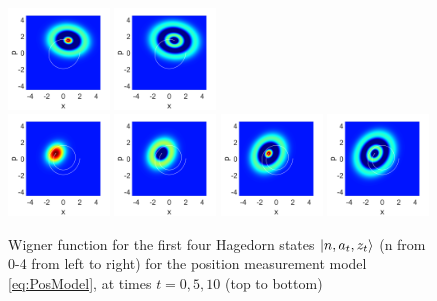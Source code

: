 \documentclass[12pt]{iopart} %
\begin{document}
\begin{figure}
\begin{centering}
	  \includegraphics[width=0.24\textwidth]{State2t5OrthoPos.pdf} 
	  \includegraphics[width=0.24\textwidth]{State3t5OrthoPos.pdf}\\
	  \includegraphics[width=0.24\textwidth]{State0t10OrthoPos.pdf}
	  \includegraphics[width=0.24\textwidth]{State1t10OrthoPos.pdf}
	  \includegraphics[width=0.24\textwidth]{State2t10OrthoPos.pdf}
	  \includegraphics[width=0.24\textwidth]{State3t10OrthoPos.pdf} \\
\caption{Wigner function for the first four Hagedorn states $\ket{n,a_t,z_t}$ (n from 0-4 from left to right) for the position measurement model \cref{eq:PosModel}, at times $t=0,5,10$ (top to bottom)}\label{fig:HagBasis}
\end{centering}
\end{figure}
\end{document}

